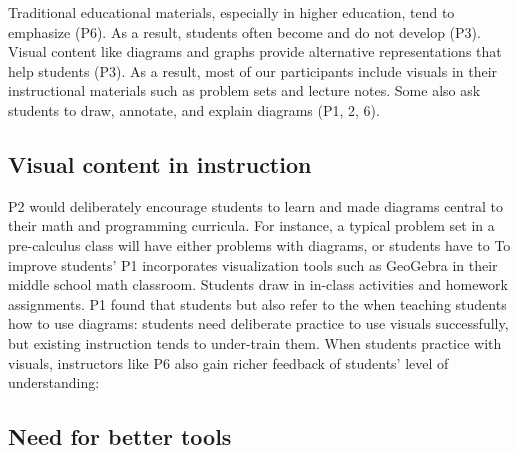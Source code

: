 Traditional educational materials, especially in higher education, tend to emphasize  (P6). As a result, students often become  and do not develop  (P3). Visual content like diagrams and graphs provide alternative representations that help students  (P3). As a result, most of our participants include visuals in their instructional materials such as problem sets and lecture notes. Some also ask students to draw, annotate, and explain diagrams (P1, 2, 6). 

\subsection{Visual content in instruction}

P2 would deliberately encourage students to learn  and made diagrams central to their math and programming curricula. For instance, a typical problem set in a pre-calculus class will have either problems with diagrams, or students have to  To improve students'  P1 incorporates visualization tools such as GeoGebra in their middle school math classroom. Students draw in in-class activities and homework assignments. P1 found that students  but also refer to the  when teaching students how to use diagrams: students need deliberate practice to use visuals successfully, but existing instruction tends to under-train them. When students practice with visuals, instructors like P6 also gain richer feedback of students' level of understanding: 

\subsection{Need for better tools}

